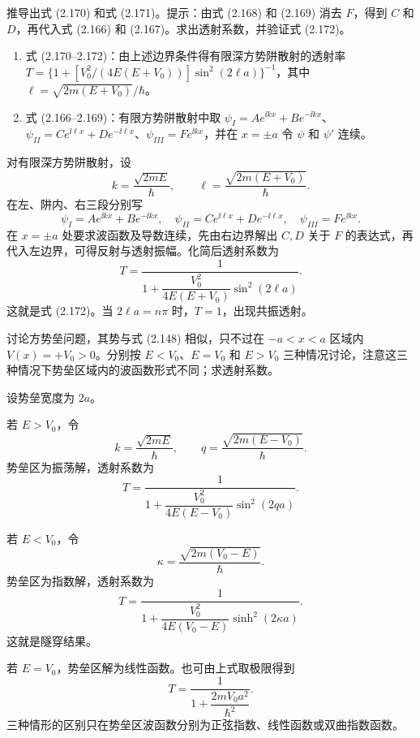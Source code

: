 \begin{question}
推导出式 (2.170) 和式 (2.171)。提示：由式 (2.168) 和 (2.169) 消去 $F$，得到 $C$ 和 $D$，再代入式 (2.166) 和 (2.167)。求出透射系数，并验证式 (2.172)。

\par\smallskip
{}
\begin{enumerate}[leftmargin=2.2em,itemsep=0.12em,topsep=0.12em,parsep=0pt]
\item 式 (2.170--2.172)：由上述边界条件得有限深方势阱散射的透射率 $T=\{1+[V_0^2/(4E(E+V_0))]\sin^2(2\ell a)\}^{-1}$，其中 $\ell=\sqrt{2m(E+V_0)}/\hbar$。
\item 式 (2.166--2.169)：有限方势阱散射中取 $\psi_I=Ae^{\ii kx}+Be^{-\ii kx}$、$\psi_{II}=Ce^{\ii\ell x}+De^{-\ii\ell x}$、$\psi_{III}=Fe^{\ii kx}$，并在 $x=\pm a$ 令 $\psi$ 和 $\psi'$ 连续。
\end{enumerate}

\end{question}
\begin{solution}
对有限深方势阱散射，设
\[
k=\frac{\sqrt{2mE}}{\hbar},
\qquad
\ell=\frac{\sqrt{2m(E+V_0)}}{\hbar}.
\]
在左、阱内、右三段分别写
\[
\psi_I=Ae^{\ii kx}+Be^{-\ii kx},
\quad
\psi_{II}=Ce^{\ii\ell x}+De^{-\ii\ell x},
\quad
\psi_{III}=Fe^{\ii kx}.
\]
在 $x=\pm a$ 处要求波函数及导数连续，先由右边界解出 $C,D$ 关于 $F$ 的表达式，再代入左边界，可得反射与透射振幅。化简后透射系数为
\[
T=\frac1{1+\dfrac{V_0^2}{4E(E+V_0)}\sin^2(2\ell a)}.
\]
这就是式 (2.172)。当 $2\ell a=n\pi$ 时，$T=1$，出现共振透射。
\end{solution}

\begin{question}
讨论方势垒问题，其势与式 (2.148) 相似，只不过在 $-a<x<a$ 区域内 $V(x)=+V_0>0$。分别按 $E<V_0$、$E=V_0$ 和 $E>V_0$ 三种情况讨论，注意这三种情况下势垒区域内的波函数形式不同；求透射系数。

\par\smallskip
{}

\end{question}
\begin{solution}
设势垒宽度为 $2a$。

若 $E>V_0$，令
\[
k=\frac{\sqrt{2mE}}{\hbar},
\qquad
q=\frac{\sqrt{2m(E-V_0)}}{\hbar}.
\]
势垒区为振荡解，透射系数为
\[
T=\frac1{1+\dfrac{V_0^2}{4E(E-V_0)}\sin^2(2qa)}.
\]

若 $E<V_0$，令
\[
\kappa=\frac{\sqrt{2m(V_0-E)}}{\hbar}.
\]
势垒区为指数解，透射系数为
\[
T=\frac1{1+\dfrac{V_0^2}{4E(V_0-E)}\sinh^2(2\kappa a)}.
\]
这就是隧穿结果。

若 $E=V_0$，势垒区解为线性函数。也可由上式取极限得到
\[
T=\frac1{1+\dfrac{2mV_0a^2}{\hbar^2}}.
\]
三种情形的区别只在势垒区波函数分别为正弦指数、线性函数或双曲指数函数。
\end{solution}

